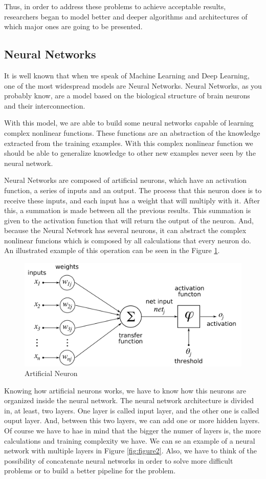 \documentclass[12pt]{article}
\begin{document}
Thus, in order to address these problems to achieve acceptable results, researchers began to model better and deeper algorithms and architectures of which major ones are going to be presented.

\subsection{Neural Networks}
\label{sec:Neural Networks}
It is well known that when we speak of Machine Learning and Deep Learning, one of the most widespread models are Neural Networks. Neural Networks, as you probably know, are a model based on the biological structure of brain neurons and their interconnection.

With this model, we are able to build some neural networks capable of learning complex nonlinear functions. These functions are an abstraction of the knowledge extracted from the training examples. With this complex nonlinear function we should be able to generalize knowledge to other new examples never seen by the neural network.

Neural Networks are composed of artificial neurons, which have an activation function, a series of inputs and an output. The process that this neuron does is to receive these inputs, and each input has a weight that will multiply with it. After this, a summation is made between all the previous results. This summation is given to the activation function that will return the output of the neuron. And, because the Neural Network has several neurons, it can abstract the complex nonlinear funcions which is composed by all calculations that every neuron do. An illustrated example of this operation can be seen in the Figure \ref{fig:figure1}.

\begin{figure}[ht]
\centering
\includegraphics[width=.4\textwidth]{Neuron.png}
\caption{Artificial Neuron}
\label{fig:figure1}
\end{figure}

Knowing how artificial neurons works, we have to know how this neurons are organized inside the neural network. The neural network architecture is divided in, at least, two layers. One layer is called input layer, and the other one is called ouput layer. And, between this two layers, we can add one or more hidden layers. Of course we have to hae in mind that the bigger the numer of layers is, the more calculations and training complexity we have. We can se an example of a neural network with multiple layers in Figure \ref{fig:figure2}. Also, we have to think of the possibility of concatenate neural networks in order to solve more difficult problems or to build a better pipeline for the problem.
\end{document}
